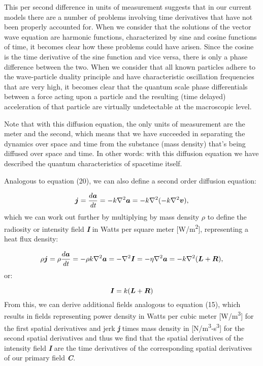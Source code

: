 \documentclass[a4paper]{article}
\newcommand\textstyleNone[1]{#1}
\newcommand\boldsubformula[1]{\text{\mathversion{bold}$#1$}}
\begin{document}
This per second difference in units of measurement suggests that in our current models there are a number of problems
involving time derivatives that have not been properly accounted for. When we consider that the solutions of the vector
wave equation are harmonic functions, characterized by sine and cosine functions of time, it becomes clear how these
problems could have arisen. Since the cosine is the time derivative of the sine function and vice versa, there is only
a phase difference between the two. When we consider that all known particles adhere to the wave-particle duality
principle and have characteristic oscillation frequencies that are very high, it becomes clear that the quantum scale
phase differentials between a force acting upon a particle and the resulting (time delayed) acceleration of that
particle are virtually undetectable at the macroscopic level.  

Note that with this diffusion equation, the only units of measurement are the meter and the second, which means that
w\textstyleNone{e have succeeded in separating the dynamics over space and time from the substance (mass density)
that's being diffused over space and time. In other words: with this diffusion equation we have described the quantum
characteristics of spacetime itself. }

Analogous to equation (20), we can also define a second order diffusion equation:

\begin{equation}
\boldsubformula j=\frac{d\boldsubformula a}{\mathit{dt}}=-k{\nabla}^2\boldsubformula a=-k\nabla ^2(-k\nabla
^2\boldsubformula v),
\end{equation}
which we can work out further by multiplying by mass density $\rho $ to define the radiosity or intensity field
\textbf{\textit{I}} in Watts per square meter [W/m\textsuperscript{2}], representing a heat flux density:

\begin{equation}
\rho \boldsubformula j=\rho \frac{d\boldsubformula a}{\mathit{dt}}=-\rho k\nabla ^2\boldsubformula a=-\nabla
^2\boldsubformula I=-\eta \nabla ^2\boldsubformula a=-k\nabla ^2(\boldsubformula L+\boldsubformula R),
\end{equation}
or:

\begin{equation}
\boldsubformula I=k(\boldsubformula L+\boldsubformula R)
\end{equation}
From this, we can derive additional fields analogous to equation (15), which results in fields representing power
density in Watts per cubic meter [W/m\textsuperscript{3}] for the first spatial derivatives and jerk
\textbf{\textit{j}} times mass density in [N/m\textsuperscript{3}{}-s\textsuperscript{3}] for the second spatial
derivatives and thus we find that the spatial derivatives of the intensity field \textbf{\textit{I}} are the time
derivatives of the corresponding spatial derivatives of our primary field \textbf{\textit{C}}.
\end{document}
